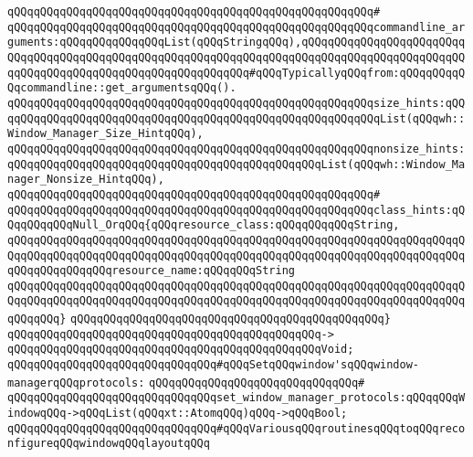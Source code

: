 \verb|qQQqqQQqqQQqqQQqqQQqqQQqqQQqqQQqqQQqqQQqqQQqqQQqqQQqqQQq#|\newline
\verb|qQQqqQQqqQQqqQQqqQQqqQQqqQQqqQQqqQQqqQQqqQQqqQQqqQQqqQQqcommandline_arguments:qQQqqQQqqQQqqQQqList(qQQqStringqQQq),qQQqqQQqqQQqqQQqqQQqqQQqqQQqqQQqqQQqqQQqqQQqqQQqqQQqqQQqqQQqqQQqqQQqqQQqqQQqqQQqqQQqqQQqqQQqqQQqqQQqqQQqqQQqqQQqqQQqqQQqqQQqqQQqqQQq#qQQqTypicallyqQQqfrom:qQQqqQQqqQQqcommandline::get_argumentsqQQq().|\newline
\verb|qQQqqQQqqQQqqQQqqQQqqQQqqQQqqQQqqQQqqQQqqQQqqQQqqQQqqQQqsize_hints:qQQqqQQqqQQqqQQqqQQqqQQqqQQqqQQqqQQqqQQqqQQqqQQqqQQqqQQqqQQqList(qQQqwh::Window_Manager_Size_HintqQQq),|\newline
\verb|qQQqqQQqqQQqqQQqqQQqqQQqqQQqqQQqqQQqqQQqqQQqqQQqqQQqqQQqnonsize_hints:qQQqqQQqqQQqqQQqqQQqqQQqqQQqqQQqqQQqqQQqqQQqqQQqList(qQQqwh::Window_Manager_Nonsize_HintqQQq),|\newline
\verb|qQQqqQQqqQQqqQQqqQQqqQQqqQQqqQQqqQQqqQQqqQQqqQQqqQQqqQQq#|\newline
\verb|qQQqqQQqqQQqqQQqqQQqqQQqqQQqqQQqqQQqqQQqqQQqqQQqqQQqqQQqclass_hints:qQQqqQQqqQQqNull_OrqQQq{qQQqresource_class:qQQqqQQqqQQqString,|\newline
\verb|qQQqqQQqqQQqqQQqqQQqqQQqqQQqqQQqqQQqqQQqqQQqqQQqqQQqqQQqqQQqqQQqqQQqqQQqqQQqqQQqqQQqqQQqqQQqqQQqqQQqqQQqqQQqqQQqqQQqqQQqqQQqqQQqqQQqqQQqqQQqqQQqqQQqqQQqqQQqresource_name:qQQqqQQqString|\newline
\verb|qQQqqQQqqQQqqQQqqQQqqQQqqQQqqQQqqQQqqQQqqQQqqQQqqQQqqQQqqQQqqQQqqQQqqQQqqQQqqQQqqQQqqQQqqQQqqQQqqQQqqQQqqQQqqQQqqQQqqQQqqQQqqQQqqQQqqQQqqQQqqQQqqQQq}|\newline
\verb|qQQqqQQqqQQqqQQqqQQqqQQqqQQqqQQqqQQqqQQqqQQqqQQq}|\newline
\verb|qQQqqQQqqQQqqQQqqQQqqQQqqQQqqQQqqQQqqQQqqQQqqQQq->|\newline
\verb|qQQqqQQqqQQqqQQqqQQqqQQqqQQqqQQqqQQqqQQqqQQqqQQqVoid;|\newline
\newline
\verb|qQQqqQQqqQQqqQQqqQQqqQQqqQQqqQQq#qQQqSetqQQqwindow'sqQQqwindow-managerqQQqprotocols:|\newline
\verb|qQQqqQQqqQQqqQQqqQQqqQQqqQQqqQQq#|\newline
\verb|qQQqqQQqqQQqqQQqqQQqqQQqqQQqqQQqset_window_manager_protocols:qQQqqQQqWindowqQQq->qQQqList(qQQqxt::AtomqQQq)qQQq->qQQqBool;|\newline
\newline
\verb|qQQqqQQqqQQqqQQqqQQqqQQqqQQqqQQq#qQQqVariousqQQqroutinesqQQqtoqQQqreconfigureqQQqwindowqQQqlayoutqQQq|\newline
